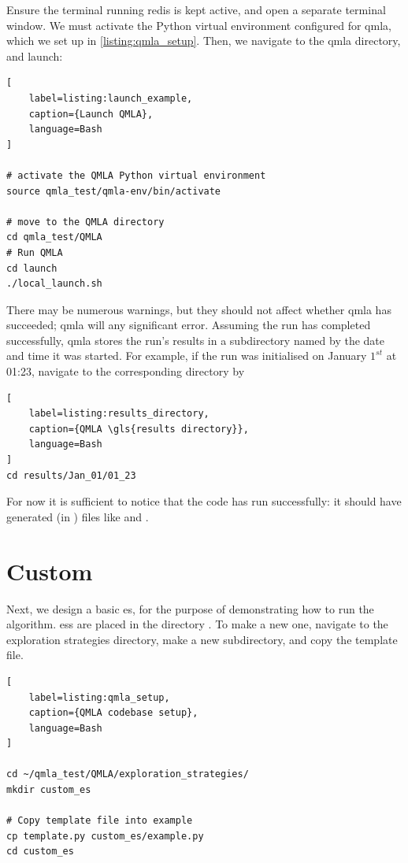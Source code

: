 Ensure the terminal running redis is kept active, and open a separate terminal window. 
We must activate the Python virtual environment configured for \gls{qmla}, 
which we set up in \cref{listing:qmla_setup}. 
Then, we navigate to the \gls{qmla} directory, and launch:
\begin{lstlisting}[
    label=listing:launch_example,
    caption={Launch QMLA},
    language=Bash
]

# activate the QMLA Python virtual environment 
source qmla_test/qmla-env/bin/activate

# move to the QMLA directory 
cd qmla_test/QMLA
# Run QMLA
cd launch   
./local_launch.sh

\end{lstlisting}

There may be numerous warnings, but they should not affect whether \gls{qmla} has succeeded; 
    \gls{qmla} will  any significant error. 
Assuming the \gls{run} has completed successfully, \gls{qmla} stores the run's results in a subdirectory
    named by the date and time it was started.  
For example, if the \gls{run} was initialised on January $1^{st}$ at 01:23, navigate to the corresponding directory by

\begin{lstlisting}[
    label=listing:results_directory,
    caption={QMLA \gls{results directory}},
    language=Bash
]
cd results/Jan_01/01_23
\end{lstlisting}

For now it is sufficient to notice that the code has \gls{run} successfully:
    it should have generated (in ) files like  and .

\section{Custom }

Next, we design a basic \gls{es}, for the purpose of demonstrating how to \gls{run} the algorithm.
\glspl{es} are placed in the directory . 
To make a new one, navigate to the exploration strategies directory, 
make a new subdirectory, and copy the template file. 

\begin{lstlisting}[
    label=listing:qmla_setup,
    caption={QMLA codebase setup},
    language=Bash
]

cd ~/qmla_test/QMLA/exploration_strategies/
mkdir custom_es

# Copy template file into example
cp template.py custom_es/example.py
cd custom_es

\end{lstlisting}


